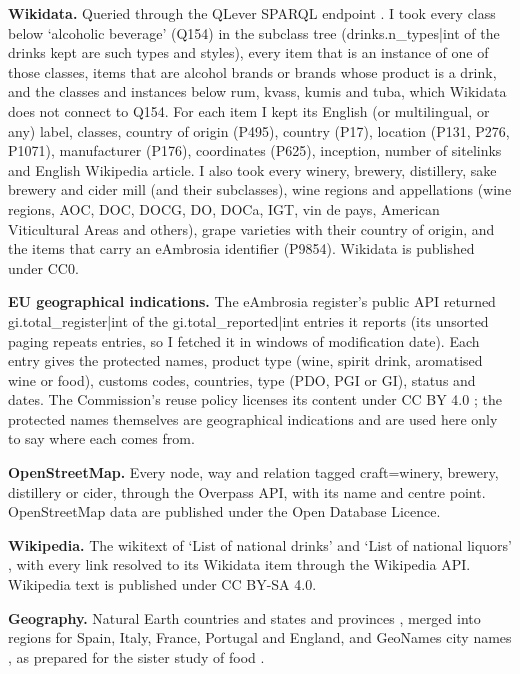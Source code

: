 \documentclass[11pt,a4paper]{article}
\begin{document}
\textbf{Wikidata.} Queried through the QLever SPARQL endpoint \citep{qlever}. I took every class below `alcoholic beverage' (Q154) in the subclass tree ({{drinks.n_types|int}} of the drinks kept are such types and styles), every item that is an instance of one of those classes, items that are alcohol brands or brands whose product is a drink, and the classes and instances below rum, kvass, kumis and tuba, which Wikidata does not connect to Q154. For each item I kept its English (or multilingual, or any) label, classes, country of origin (P495), country (P17), location (P131, P276, P1071), manufacturer (P176), coordinates (P625), inception, number of sitelinks and English Wikipedia article. I also took every winery, brewery, distillery, sake brewery and cider mill (and their subclasses), wine regions and appellations (wine regions, AOC, DOC, DOCG, DO, DOCa, IGT, vin de pays, American Viticultural Areas and others), grape varieties with their country of origin, and the items that carry an eAmbrosia identifier (P9854). Wikidata is published under CC0.

\textbf{EU geographical indications.} The eAmbrosia register's public API \citep{eambrosia} returned {{gi.total_register|int}} of the {{gi.total_reported|int}} entries it reports (its unsorted paging repeats entries, so I fetched it in windows of modification date). Each entry gives the protected names, product type (wine, spirit drink, aromatised wine or food), customs codes, countries, type (PDO, PGI or GI), status and dates. The Commission's reuse policy licenses its content under CC BY 4.0 \citep{eclegal}; the protected names themselves are geographical indications and are used here only to say where each comes from.

\textbf{OpenStreetMap.} Every node, way and relation tagged craft=winery, brewery, distillery or cider, through the Overpass API, with its name and centre point. OpenStreetMap data are published under the Open Database Licence.

\textbf{Wikipedia.} The wikitext of `List of national drinks' and `List of national liquors' \citep{wp_national,wp_liquors}, with every link resolved to its Wikidata item through the Wikipedia API. Wikipedia text is published under CC BY-SA 4.0.

\textbf{Geography.} Natural Earth countries and states and provinces \citep{naturalearth}, merged into regions for Spain, Italy, France, Portugal and England, and GeoNames city names \citep{geonames}, as prepared for the sister study of food \citep{foodmap}.
\end{document}
